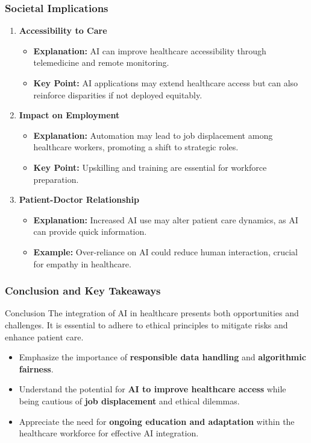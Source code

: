 \documentclass[aspectratio=169]{beamer}
\begin{document}
\begin{frame}[fragile]
    \frametitle{Societal Implications}
    \begin{enumerate}
        \item \textbf{Accessibility to Care}
            \begin{itemize}
                \item \textbf{Explanation:} AI can improve healthcare accessibility through telemedicine and remote monitoring.
                \item \textbf{Key Point:} AI applications may extend healthcare access but can also reinforce disparities if not deployed equitably.
            \end{itemize}

        \item \textbf{Impact on Employment}
            \begin{itemize}
                \item \textbf{Explanation:} Automation may lead to job displacement among healthcare workers, promoting a shift to strategic roles.
                \item \textbf{Key Point:} Upskilling and training are essential for workforce preparation.
            \end{itemize}

        \item \textbf{Patient-Doctor Relationship}
            \begin{itemize}
                \item \textbf{Explanation:} Increased AI use may alter patient care dynamics, as AI can provide quick information.
                \item \textbf{Example:} Over-reliance on AI could reduce human interaction, crucial for empathy in healthcare.
            \end{itemize}
    \end{enumerate}
\end{frame}

\begin{frame}[fragile]
    \frametitle{Conclusion and Key Takeaways}
    \begin{block}{Conclusion}
        The integration of AI in healthcare presents both opportunities and challenges. It is essential to adhere to ethical principles to mitigate risks and enhance patient care.
    \end{block}
    
    \begin{itemize}
        \item Emphasize the importance of \textbf{responsible data handling} and \textbf{algorithmic fairness}.
        \item Understand the potential for \textbf{AI to improve healthcare access} while being cautious of \textbf{job displacement} and ethical dilemmas.
        \item Appreciate the need for \textbf{ongoing education and adaptation} within the healthcare workforce for effective AI integration.
    \end{itemize}
\end{frame}
\end{document}
